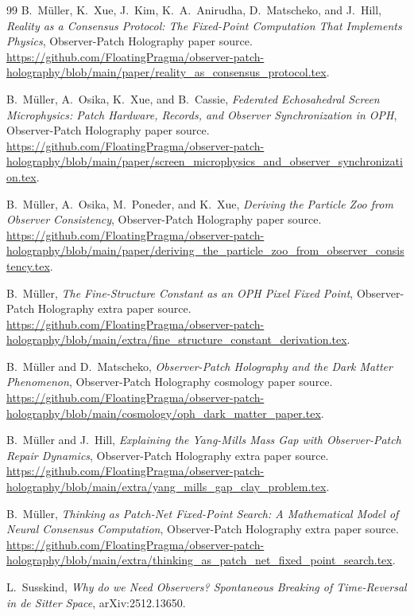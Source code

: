\documentclass[11pt]{article}
\theoremstyle{remark}
\theoremstyle{plain}
\begin{document}
\begin{thebibliography}{99}
B.\ M\"uller, K.\ Xue, J.\ Kim, K.\ A.\ Anirudha, D.\ Matscheko, and J.\ Hill,
\emph{Reality as a Consensus Protocol: The Fixed-Point Computation That Implements Physics},
Observer-Patch Holography paper source.
\url{https://github.com/FloatingPragma/observer-patch-holography/blob/main/paper/reality_as_consensus_protocol.tex}.

B.\ M\"uller, A.\ Osika, K.\ Xue, and B.\ Cassie,
\emph{Federated Echosahedral Screen Microphysics: Patch Hardware, Records, and Observer Synchronization in OPH},
Observer-Patch Holography paper source.
\url{https://github.com/FloatingPragma/observer-patch-holography/blob/main/paper/screen_microphysics_and_observer_synchronization.tex}.

B.\ M\"uller, A.\ Osika, M.\ Poneder, and K.\ Xue,
\emph{Deriving the Particle Zoo from Observer Consistency},
Observer-Patch Holography paper source.
\url{https://github.com/FloatingPragma/observer-patch-holography/blob/main/paper/deriving_the_particle_zoo_from_observer_consistency.tex}.

B.\ M\"uller,
\emph{The Fine-Structure Constant as an OPH Pixel Fixed Point},
Observer-Patch Holography extra paper source.
\url{https://github.com/FloatingPragma/observer-patch-holography/blob/main/extra/fine_structure_constant_derivation.tex}.

B.\ M\"uller and D.\ Matscheko,
\emph{Observer-Patch Holography and the Dark Matter Phenomenon},
Observer-Patch Holography cosmology paper source.
\url{https://github.com/FloatingPragma/observer-patch-holography/blob/main/cosmology/oph_dark_matter_paper.tex}.

B.\ M\"uller and J.\ Hill,
\emph{Explaining the Yang-Mills Mass Gap with Observer-Patch Repair Dynamics},
Observer-Patch Holography extra paper source.
\url{https://github.com/FloatingPragma/observer-patch-holography/blob/main/extra/yang_mills_gap_clay_problem.tex}.

B.\ M\"uller,
\emph{Thinking as Patch-Net Fixed-Point Search: A Mathematical Model of Neural Consensus Computation},
Observer-Patch Holography extra paper source.
\url{https://github.com/FloatingPragma/observer-patch-holography/blob/main/extra/thinking_as_patch_net_fixed_point_search.tex}.

L.\ Susskind,
\emph{Why do we Need Observers? Spontaneous Breaking of Time-Reversal in de Sitter Space},
arXiv:2512.13650.


\end{thebibliography}
\end{document}
